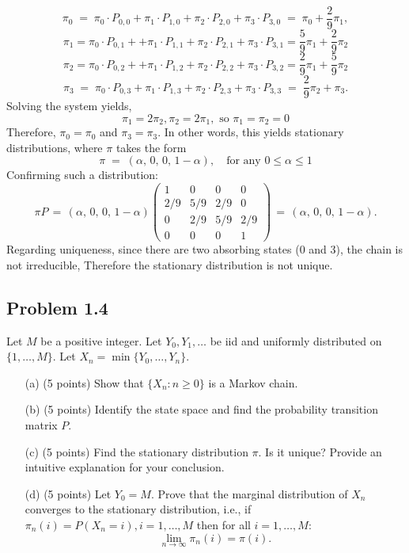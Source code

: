 \documentclass{article}
\begin{document}
\begin{enumerate}
{\[
\pi_0 
\;=\;
\pi_0 \cdot P_{0,0} + \pi_1 \cdot P_{1,0} + \pi_2 \cdot P_{2,0} + \pi_3 \cdot P_{3,0}
\;=\;
\pi_0 + \frac{2}{9}\pi_1,
\]
$$\pi_1 = \pi_0 \cdot P_{0,1} + + \pi_1 \cdot P_{1,1} + \pi_2 \cdot P_{2,1} + \pi_3 \cdot P_{3,1}
=\frac{5}{9}\pi_1 + \frac{2}{9}\pi_2$$
$$\pi_2 = \pi_0 \cdot P_{0,2} + + \pi_1 \cdot P_{1,2} + \pi_2 \cdot P_{2,2} + \pi_3 \cdot P_{3,2}=
\frac{2}{9}\pi_1 + \frac{5}{9}\pi_2$$
\[
\pi_3 
\;=\;
\pi_0 \cdot P_{0,3} + \pi_1 \cdot P_{1,3} + \pi_2 \cdot P_{2,3} + \pi_3 \cdot P_{3,3}
\;=\;
\frac{2}{9}\pi_2 + \pi_3.
\]
Solving the system yields, 
$$\pi_1=2\pi_2, \pi_2=2\pi_1, \text{ so } \pi_1=\pi_2=0$$ Therefore, $\pi_0=\pi_0$ and $\pi_3=\pi_3$. In other words, this yields stationary distributions, where $\pi$ takes the form
\[
\pi \;=\; (\alpha,\, 0,\, 0,\, 1-\alpha),
\quad
\text{for any } 0 \le \alpha \le 1
\]
Confirming such a distribution:
\[
\pi P 
\,=\,
(\alpha,\, 0,\, 0,\, 1-\alpha)
\begin{pmatrix}
1 & 0 & 0 & 0\\
2/9 & 5/9 & 2/9 & 0\\
0 & 2/9 & 5/9 & 2/9\\
0 & 0 & 0 & 1
\end{pmatrix}
\,=\,
(\alpha,\, 0,\, 0,\, 1-\alpha).
\]
Regarding uniqueness, since there are two absorbing states ($0$ and $3$), the chain is not irreducible, Therefore the stationary distribution is not unique. 
}
\end{enumerate}

\subsection*{Problem 1.4}
Let $M$ be a positive integer. Let $Y_0, Y_1, \ldots$ be iid and uniformly distributed on $\{1, \ldots, M\}$. Let $X_n = \min\{Y_0, \ldots, Y_n\}$.

\begin{enumerate}
    \item[(a)] (5 points) Show that $\{X_n : n \geq 0\}$ is a Markov chain.
    \item[(b)] (5 points) Identify the state space and find the probability transition matrix $P$.
    \item[(c)] (5 points) Find the stationary distribution $\pi$. Is it unique? Provide an intuitive explanation for your conclusion.
    \item[(d)] (5 points) Let $Y_0 = M$. Prove that the marginal distribution of $X_n$ converges to the stationary distribution, i.e., if $\pi_n(i) = P(X_n = i), i = 1, \ldots, M$ then for all $i = 1, \ldots, M$:
    \[
    \lim_{n \to \infty} \pi_n(i) = \pi(i).
    \]
\end{enumerate}
\end{document}
